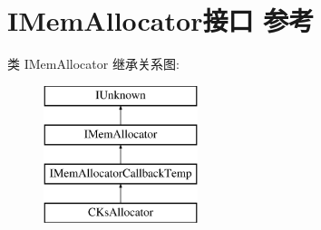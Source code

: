 \hypertarget{interface_i_mem_allocator}{}\section{I\+Mem\+Allocator接口 参考}
\label{interface_i_mem_allocator}
类 I\+Mem\+Allocator 继承关系图\+:\begin{figure}[H]
\begin{center}
\leavevmode
\includegraphics[height=4.000000cm]{interface_i_mem_allocator}
\end{center}
\end{figure}
